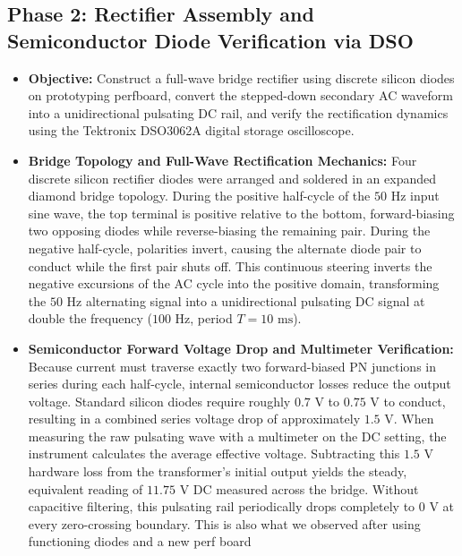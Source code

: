 \documentclass[journal,12pt,onecolumn]{IEEEtran}
\begin{document}
\subsection*{\textbf{Phase 2:} Rectifier Assembly and Semiconductor Diode Verification via DSO}

\begin{itemize}
    \item \textbf{Objective:} Construct a full-wave bridge rectifier using discrete silicon diodes on prototyping perfboard, convert the stepped-down secondary AC waveform into a unidirectional pulsating DC rail, and verify the rectification dynamics using the Tektronix DSO3062A digital storage oscilloscope.

    \item \textbf{Bridge Topology and Full-Wave Rectification Mechanics:} Four discrete silicon rectifier diodes were arranged and soldered in an expanded diamond bridge topology. During the positive half-cycle of the $50\text{ Hz}$ input sine wave, the top terminal is positive relative to the bottom, forward-biasing two opposing diodes while reverse-biasing the remaining pair. During the negative half-cycle, polarities invert, causing the alternate diode pair to conduct while the first pair shuts off. This continuous steering inverts the negative excursions of the AC cycle into the positive domain, transforming the $50\text{ Hz}$ alternating signal into a unidirectional pulsating DC signal at double the frequency ($100\text{ Hz}$, period $T = 10\text{ ms}$).
    
    \item \textbf{Semiconductor Forward Voltage Drop and Multimeter Verification:} Because current must traverse exactly two forward-biased PN junctions in series during each half-cycle, internal semiconductor losses reduce the output voltage. Standard silicon diodes require roughly $0.7\text{ V}$ to $0.75\text{ V}$ to conduct, resulting in a combined series voltage drop of approximately $1.5\text{ V}$. When measuring the raw pulsating wave with a multimeter on the DC setting, the instrument calculates the average effective voltage. Subtracting this $1.5\text{ V}$ hardware loss from the transformer's initial output yields the steady, equivalent reading of $11.75\text{ V}$ DC measured across the bridge. Without capacitive filtering, this pulsating rail periodically drops completely to $0\text{ V}$ at every zero-crossing boundary. This is also what we observed after using functioning diodes and a new perf board
    \end{itemize}
\end{document}
